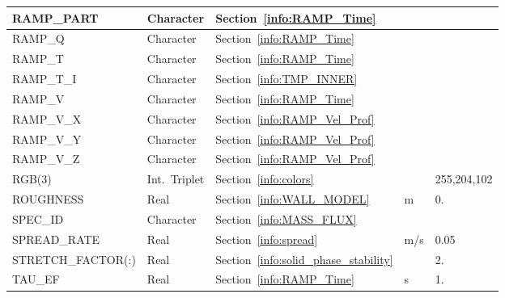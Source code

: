 \documentclass[11pt]{book}
\begin{document}
\begin{longtable}{@{\extracolsep{\fill}}|l|l|l|l|l|}
{\ct RAMP\_PART}                      & Character       & Section~\ref{info:RAMP_Time}              &                     &                         \\ \hline
{\ct RAMP\_Q}                         & Character       & Section~\ref{info:RAMP_Time}              &                     &                         \\ \hline
{\ct RAMP\_T}                         & Character       & Section~\ref{info:RAMP_Time}              &                     &                         \\ \hline
{\ct RAMP\_T\_I}                      & Character       & Section~\ref{info:TMP_INNER}              &                     &                         \\ \hline
{\ct RAMP\_V}                         & Character       & Section~\ref{info:RAMP_Time}              &                     &                         \\ \hline
{\ct RAMP\_V\_X}                      & Character       & Section~\ref{info:RAMP_Vel_Prof}          &                     &                         \\ \hline
{\ct RAMP\_V\_Y}                      & Character       & Section~\ref{info:RAMP_Vel_Prof}          &                     &                         \\ \hline
{\ct RAMP\_V\_Z}                      & Character       & Section~\ref{info:RAMP_Vel_Prof}          &                     &                         \\ \hline
{\ct RGB(3)}                          & Int.~Triplet    & Section~\ref{info:colors}                 &                     & \small 255,204,102      \\ \hline
{\ct ROUGHNESS}                       & Real            & Section~\ref{info:WALL_MODEL}             & m                   & 0.                      \\ \hline
{\ct SPEC\_ID}                        & Character       & Section~\ref{info:MASS_FLUX}              &                     &                         \\ \hline
{\ct SPREAD\_RATE}                    & Real            & Section~\ref{info:spread}                 & m/s                 & 0.05                    \\ \hline
{\ct STRETCH\_FACTOR(:) }             & Real            & Section~\ref{info:solid_phase_stability}  &                     & 2.                      \\ \hline
{\ct TAU\_EF}                         & Real            & Section~\ref{info:RAMP_Time}              & s                   & 1.                      \\ \hline

\end{longtable}
\end{document}
